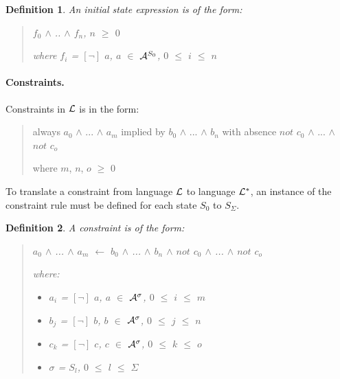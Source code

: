 \documentclass[10pt, twocolumn]{article}
\newtheorem{definition}{Definition}
\begin{document}
          \begin{definition}
            An initial state expression is of the form:

            \begin{quote}
              $f_{0}$ $\land$ .. $\land$ $f_{n}$, $n$ $\geq$ $0$

              where $f_{i}$ = $[\lnot]$ $a$, $a$ $\in$ ${\cal A}^{S_{0}}$, $0$ $\leq$ $i$ $\leq$ $n$
            \end{quote}

          \end{definition}

        \paragraph{Constraints.}

          Constraints in ${\cal L}$ is in the form:

          \begin{quote}
            always $a_{0}$ $\land$ ... $\land$ $a_{m}$
            implied by $b_{0}$ $\land$ ... $\land$ $b_{n}$
            with absence $not$ $c_{0}$ $\land$ ... $\land$ $not$ $c_{o}$

            where $m$, $n$, $o$ $\geq$ $0$
          \end{quote}

          To translate a constraint from language ${\cal L}$ to language
          ${\cal L}^{*}$, an instance of the constraint rule must be defined
          for each state $S_{0}$ to $S_{\Sigma}$.

          \begin{definition}
            A constraint is of the form:

            \begin{quote}
              $a_{0}$ $\land$ ... $\land$ $a_{m}$ $\leftarrow$ $b_{0}$ $\land$ ... $\land$ $b_{n}$ $\land$ $not$ $c_{0}$ $\land$ ... $\land$ $not$ $c_{o}$

              where:

              \begin{itemize}
                \item
                  $a_{i}$ = $[\lnot]$ $a$, $a$ $\in$ ${\cal A}^{\sigma}$, $0$ $\leq$ $i$ $\leq$ $m$
                \item
                  $b_{j}$ = $[\lnot]$ $b$, $b$ $\in$ ${\cal A}^{\sigma}$, $0$ $\leq$ $j$ $\leq$ $n$
                \item
                  $c_{k}$ = $[\lnot]$ $c$, $c$ $\in$ ${\cal A}^{\sigma}$, $0$ $\leq$ $k$ $\leq$ $o$
                \item
                  $\sigma$ = $S_{l}$, $0$ $\leq$ $l$ $\leq$ $\Sigma$
              \end{itemize}

            \end{quote}

          \end{definition}
\end{document}
